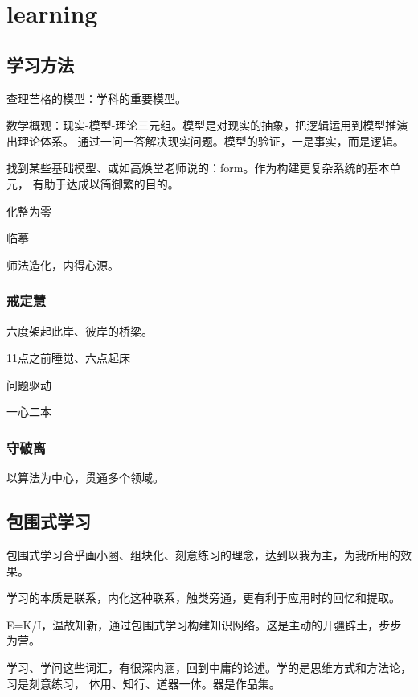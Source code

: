 \chapter{learning}

\section{学习方法}

查理芒格的模型：学科的重要模型。

数学概观：现实-模型-理论三元组。模型是对现实的抽象，把逻辑运用到模型推演出理论体系。
通过一问一答解决现实问题。模型的验证，一是事实，而是逻辑。

找到某些基础模型、或如高焕堂老师说的：form。作为构建更复杂系统的基本单元，
有助于达成以简御繁的目的。

化整为零

临摹

师法造化，内得心源。

\subsection{戒定慧}

六度架起此岸、彼岸的桥梁。

\begin{enumbox}
\item 11点之前睡觉、六点起床
\item 问题驱动
\item 一心二本
\end{enumbox}

\subsection{守破离}

以算法为中心，贯通多个领域。

\section{包围式学习}

包围式学习合乎画小圈、组块化、刻意练习的理念，达到以我为主，为我所用的效果。

学习的本质是联系，内化这种联系，触类旁通，更有利于应用时的回忆和提取。

E=K/I，温故知新，通过包围式学习构建知识网络。这是主动的开疆辟土，步步为营。

学习、学问这些词汇，有很深内涵，回到中庸的论述。学的是思维方式和方法论，习是刻意练习，
体用、知行、道器一体。器是作品集。

